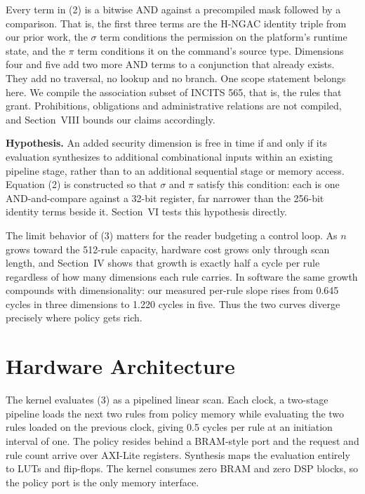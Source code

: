 \documentclass[conference]{IEEEtran}
\begin{document}
Every term in (2) is a bitwise AND against a precompiled mask followed by a comparison. That is, the first three terms are the H-NGAC identity triple from our prior work, the $\sigma$ term conditions the permission on the platform's runtime state, and the $\pi$ term conditions it on the command's source type. Dimensions four and five add two more AND terms to a conjunction that already exists. They add no traversal, no lookup and no branch. One scope statement belongs here. We compile the association subset of INCITS 565, that is, the rules that grant. Prohibitions, obligations and administrative relations are not compiled, and Section~VIII bounds our claims accordingly.

\textbf{Hypothesis.} An added security dimension is free in time if and only if its evaluation synthesizes to additional combinational inputs within an existing pipeline stage, rather than to an additional sequential stage or memory access. Equation (2) is constructed so that $\sigma$ and $\pi$ satisfy this condition: each is one AND-and-compare against a 32-bit register, far narrower than the 256-bit identity terms beside it. Section~VI tests this hypothesis directly.

The limit behavior of (3) matters for the reader budgeting a control loop. As $n$ grows toward the 512-rule capacity, hardware cost grows only through scan length, and Section~IV shows that growth is exactly half a cycle per rule regardless of how many dimensions each rule carries. In software the same growth compounds with dimensionality: our measured per-rule slope rises from 0.645 cycles in three dimensions to 1.220 cycles in five. Thus the two curves diverge precisely where policy gets rich.

\section{Hardware Architecture}

The kernel evaluates (3) as a pipelined linear scan. Each clock, a two-stage pipeline loads the next two rules from policy memory while evaluating the two rules loaded on the previous clock, giving 0.5 cycles per rule at an initiation interval of one. The policy resides behind a BRAM-style port and the request and rule count arrive over AXI-Lite registers. Synthesis maps the evaluation entirely to LUTs and flip-flops. The kernel consumes zero BRAM and zero DSP blocks, so the policy port is the only memory interface.
\end{document}
